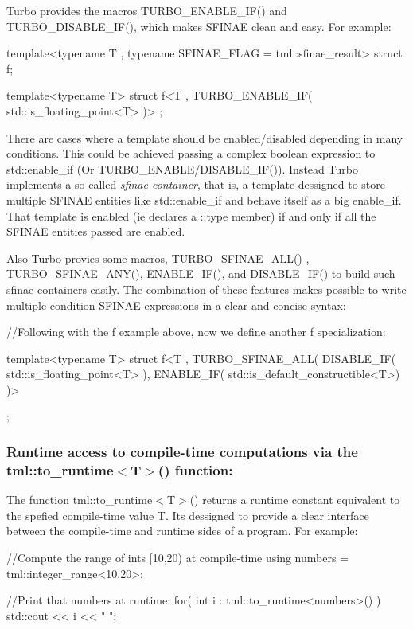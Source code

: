 Turbo provides the macros {\ttfamily T\+U\+R\+B\+O\+\_\+\+E\+N\+A\+B\+L\+E\+\_\+\+I\+F()} and {\ttfamily T\+U\+R\+B\+O\+\_\+\+D\+I\+S\+A\+B\+L\+E\+\_\+\+I\+F()}, which makes S\+F\+I\+N\+A\+E clean and easy. For example\+: \begin{DoxyVerb}template<typename T , typename SFINAE_FLAG = tml::sfinae_result>
struct f;

template<typename T>
struct f<T , TURBO_ENABLE_IF( std::is_floating_point<T> )>
{};
\end{DoxyVerb}


There are cases where a template should be enabled/disabled depending in many conditions. This could be achieved passing a complex boolean expression to {\ttfamily std\+::enable\+\_\+if} (Or {\ttfamily T\+U\+R\+B\+O\+\_\+\+E\+N\+A\+B\+L\+E/\+D\+I\+S\+A\+B\+L\+E\+\_\+\+I\+F()}). Instead Turbo implements a so-\/called {\itshape sfinae container}, that is, a template dessigned to store multiple S\+F\+I\+N\+A\+E entities like {\ttfamily std\+::enable\+\_\+if} and behave itself as a big {\ttfamily enable\+\_\+if}. That template is enabled (ie declares a {\ttfamily \+::type} member) if and only if all the S\+F\+I\+N\+A\+E entities passed are enabled.

Also Turbo provies some macros, {\ttfamily T\+U\+R\+B\+O\+\_\+\+S\+F\+I\+N\+A\+E\+\_\+\+A\+L\+L()} , {\ttfamily T\+U\+R\+B\+O\+\_\+\+S\+F\+I\+N\+A\+E\+\_\+\+A\+N\+Y()}, {\ttfamily E\+N\+A\+B\+L\+E\+\_\+\+I\+F()}, and {\ttfamily D\+I\+S\+A\+B\+L\+E\+\_\+\+I\+F()} to build such sfinae containers easily. The combination of these features makes possible to write multiple-\/condition S\+F\+I\+N\+A\+E expressions in a clear and concise syntax\+: \begin{DoxyVerb}//Following with the f example above, now we define another f specialization:

template<typename T>
struct f<T , TURBO_SFINAE_ALL( DISABLE_IF( std::is_floating_point<T> ),
                               ENABLE_IF( std::is_default_constructible<T>)
                             )>
{

};
\end{DoxyVerb}


\subsubsection*{Runtime access to compile-\/time computations via the {\ttfamily tml\+::to\+\_\+runtime$<$T$>$()} function\+:}

The function {\ttfamily tml\+::to\+\_\+runtime$<$T$>$()} returns a runtime constant equivalent to the spefied compile-\/time value {\ttfamily T}. Its dessigned to provide a clear interface between the compile-\/time and runtime sides of a program. For example\+: \begin{DoxyVerb}//Compute the range of ints [10,20) at compile-time
using numbers = tml::integer_range<10,20>;

//Print that numbers at runtime:
for( int i : tml::to_runtime<numbers>() )
    std::cout << i << " ";
\end{DoxyVerb}


